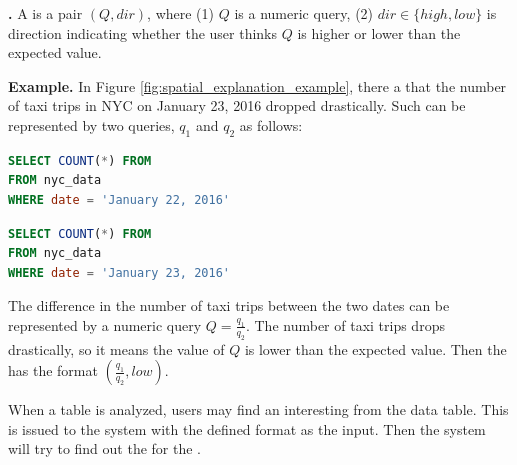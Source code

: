 {\bf {\Fact}.} A {\fact} is a pair $(Q, dir)$, where (1) $Q$ is a numeric query, (2) $dir \in \{high, low\}$ is direction indicating whether the user thinks $Q$ is higher or lower than the expected value.

{\bf Example.} In Figure \ref{fig:spatial_explanation_example}, there a {\fact} that the number of taxi trips in NYC on January 23, 2016 dropped drastically. Such {\fact} can be represented by two queries, $q_1$ and $q_2$ as follows:

\renewcommand{\lstlistingname}{Query}%
\begin{lstlisting}[language=SQL, caption=Aggregate Query for the number of taxi trips on January 22, label=qry:aggregateexample1]
SELECT COUNT(*) FROM
FROM nyc_data
WHERE date = 'January 22, 2016'
\end{lstlisting}
\renewcommand{\lstlistingname}{Query}%
\begin{lstlisting}[language=SQL, caption=Aggregate Query for the number of taxi trips on January 23, label=qry:aggregateexample2]
SELECT COUNT(*) FROM
FROM nyc_data
WHERE date = 'January 23, 2016'
\end{lstlisting}
The difference in the number of taxi trips between the two dates can be represented by a numeric query $Q = \frac{q_1}{q_2}$. The number of taxi trips drops drastically, so it means the value of $Q$ is lower than the expected value. Then the {\fact} has the format $(\frac{q_1}{q_2}, low)$.

When a table is analyzed, users may find an interesting {\fact} from the data table. This {\fact} is issued to the system with the defined format as the input. Then the system will try to find out the {\explanation} for the {\fact}.



